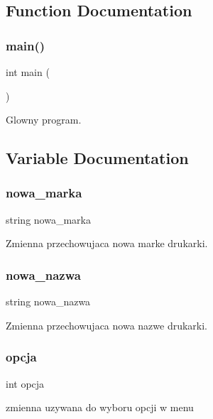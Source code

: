 \subsection{Function Documentation}
\mbox{\label{_kompilacja_8cpp_ae66f6b31b5ad750f1fe042a706a4e3d4}} 
\subsubsection{main()}
{\footnotesize\ttfamily int main (\begin{DoxyParamCaption}{ }\end{DoxyParamCaption})}



Glowny program. 



\subsection{Variable Documentation}
\mbox{\label{_kompilacja_8cpp_abdc8622b0f8bafd694447c4770b1b10c}} 
\subsubsection{nowa\+\_\+marka}
{\footnotesize\ttfamily string nowa\+\_\+marka}



Zmienna przechowujaca nowa marke drukarki. 

\mbox{\label{_kompilacja_8cpp_ad5f5ff4a0299ecc44d218b6a04da19a5}} 
\subsubsection{nowa\+\_\+nazwa}
{\footnotesize\ttfamily string nowa\+\_\+nazwa}



Zmienna przechowujaca nowa nazwe drukarki. 

\mbox{\label{_kompilacja_8cpp_adaeb9433eaa673c6d8c4793b5bfd9ec3}} 
\subsubsection{opcja}
{\footnotesize\ttfamily int opcja}



zmienna uzywana do wyboru opcji w menu 


